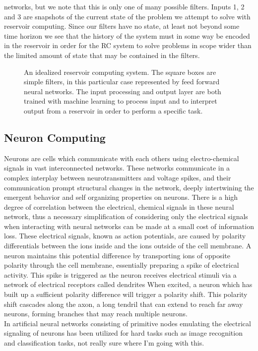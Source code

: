 networks, but we note that this is only one of many possible filters.
Inputs 1, 2 and 3 are snapshots of the current state of the problem we attempt
to solve with reservoir computing.
Since our filters have no state, at least not beyond some time horizon we see
that the history of the system must in some way be encoded in the reservoir in
order for the RC system to solve problems in scope wider than the limited amount
of state that may be contained in the filters.
\begin{figure*}[h]
  
  \caption{An idealized reservoir computing system.
  The square boxes are simple filters, in this particular case represented by
  feed forward neural networks.
  The input processing and output layer are both trained with machine learning
  to process input and to interpret output from a reservoir in order to perform
  a specific task.}
  \label{fig:RC}
\end{figure*}
\subsection{Neuron Computing}
Neurons are cells which communicate with each others using electro-chemical
signals in vast interconnected networks.
These networks communicate in a complex interplay between neurotransmitters and voltage
spikes, and their communication prompt structural changes in the network,
deeply intertwining the emergent behavior and self organizing properties on neurons.
There is a high degree of correlation between the electrical, chemical signals
in these neural network, thus a necessary simplification of considering only the
electrical signals when interacting with neural networks can be made at a small
cost of information loss.
These electrical signals, known as action potentials, are caused
by polarity differentials between the ions inside and the ions outside of the
cell membrane.
A neuron maintains this potential difference by transporting ions of opposite
polarity through the cell membrane, essentially preparing a spike of electrical
activity.
This spike is triggered as the neuron receives electrical stimuli via a network
of electrical receptors called dendrites
When excited, a neuron which has built up a sufficient polarity difference will
trigger a polarity shift.
This polarity shift cascades along the axon, a long tendril that can extend to
reach far away neurons, forming branches that may reach multiple neurons.\\
In artificial neural networks consisting of primitive nodes emulating the
electrical signaling of neurons has been utilized for hard tasks such as image
recognition and classification tasks, not really sure where I'm going with this.

